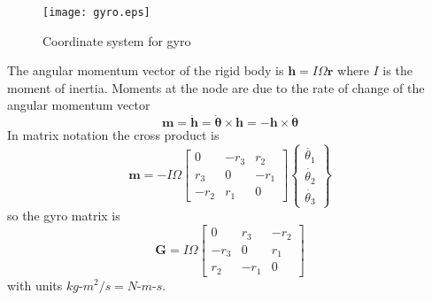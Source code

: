 \documentclass[11pt,openany,twoside]{book}
\numberwithin{equation}{section}		%
\newcommand{\Matrix}[1]{\boldsymbol{#1}}
\newcommand{\Vector}[1]{\boldsymbol{#1}}
\begin{document}
\begin{figure}[ht]
		\texttt{[image: gyro.eps]}
	\centering
	\caption{Coordinate system for gyro} \label{fig:gyro}
\end{figure}
The angular momentum vector of the rigid body is $\Vector{h} = I\Omega\Vector{r}$
where $I$ is the moment of inertia. Moments at the node are due to the rate of
change of the angular momentum vector
\begin{equation}
\Vector{m} = \dot{\Vector{h}} = \dot{\Vector{\theta}} \times \Vector{h}
	= - \Vector{h} \times \dot{\Vector{\theta}}
\end{equation}
In matrix notation the cross product is
\begin{equation}
\Vector{m} = -I\Omega\left[ \begin{array}{ccc}
			0     &   -r_3  &  r_2  \\
	      r_3  & 0     &   -r_1   \\
	      -r_2  & r_1     &   0
		\end{array} \right]
		\left\{ \begin{array}{c}
			\dot{\theta_1} \\
			\dot{\theta_2} \\
			\dot{\theta_3}
		\end{array} \right\}
\end{equation}
so the gyro matrix is
\begin{equation}
\Matrix{G} = I\Omega\left[ \begin{array}{ccc}
			0     &    r_3  &  -r_2  \\
	      -r_3  & 0     &   r_1   \\
	       r_2  & -r_1     &   0
		\end{array} \right]
\end{equation}
with units $kg\text{-}m^2/s = N\text{-}m\text{-}s$.

\end{document}
